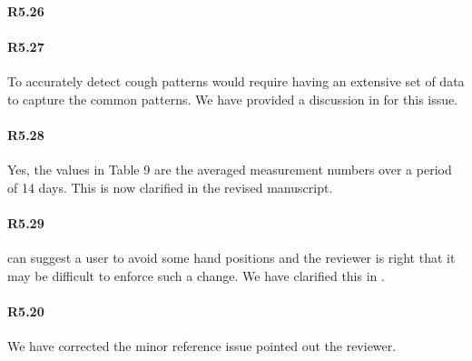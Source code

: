 \paragraph{R5.26} 

\paragraph{R5.27} To accurately detect cough patterns would require having an extensive set of data to capture the common patterns. We have provided a discussion in  for this issue.

\paragraph{R5.28} Yes, the values in Table 9 are the averaged measurement numbers over a period of 14 days. This is now clarified in the revised manuscript.

\paragraph{R5.29} \systemname can suggest a user to avoid some hand positions and the reviewer is right that it may be difficult to enforce such a change. We have clarified this in .

\paragraph{R5.20} We have corrected the minor reference issue pointed out the reviewer.
